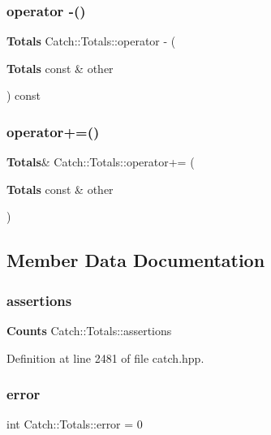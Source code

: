 \mbox{\label{struct_catch_1_1_totals_a4e78ceccf9473cbb117e1803907e174d}} 
\subsubsection{operator -\/()}
{\footnotesize\ttfamily \textbf{ Totals} Catch\+::\+Totals\+::operator -\/ (\begin{DoxyParamCaption}\item[{\textbf{ Totals} const \&}]{other }\end{DoxyParamCaption}) const}

\mbox{\label{struct_catch_1_1_totals_a574015076e54cc405c70b053e3356e43}} 
\subsubsection{operator+=()}
{\footnotesize\ttfamily \textbf{ Totals}\& Catch\+::\+Totals\+::operator+= (\begin{DoxyParamCaption}\item[{\textbf{ Totals} const \&}]{other }\end{DoxyParamCaption})}



\subsection{Member Data Documentation}
\mbox{\label{struct_catch_1_1_totals_a885ded66df752147b30c3d45aa602ec9}} 
\subsubsection{assertions}
{\footnotesize\ttfamily \textbf{ Counts} Catch\+::\+Totals\+::assertions}



Definition at line 2481 of file catch.\+hpp.

\mbox{\label{struct_catch_1_1_totals_a6ea14c7de7ea735a14f172a26e08a239}} 
\subsubsection{error}
{\footnotesize\ttfamily int Catch\+::\+Totals\+::error = 0}



